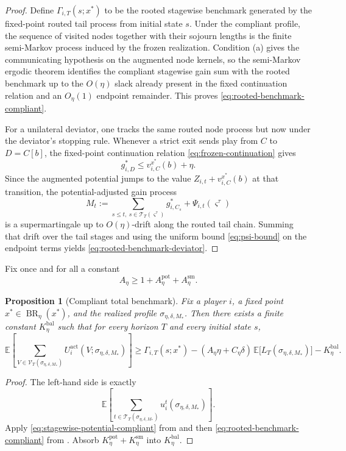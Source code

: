 \documentclass[12pt]{article}
\newtheorem{proposition}[theorem]{Proposition}
\theoremstyle{definition}
\newcommand{\E}{\mathbb{E}}
\newcommand{\1}{\mathbf{1}}
\DeclareMathOperator{\BR}{BR}
\begin{document}
\begin{proof}
Define $\Gamma_{i,T}(s;x^*)$ to be the rooted stagewise benchmark generated by the
fixed-point routed tail process from initial state $s$. Under the compliant
profile, the sequence of visited nodes together with their sojourn lengths is the
finite semi-Markov process induced by the frozen realization. Condition
\textnormal{(a)} gives the communicating hypothesis on the augmented node kernels,
so the semi-Markov ergodic theorem identifies the compliant stagewise gain sum
with the rooted benchmark up to the $O(\eta)$ slack already present in the fixed
continuation relation and an $O_\eta(1)$ endpoint remainder. This proves
\eqref{eq:rooted-benchmark-compliant}.

For a unilateral deviator, one tracks the same routed node process but now under
the deviator's stopping rule. Whenever a strict exit sends play from $C$ to
$D=C[b]$, the fixed-point continuation relation \eqref{eq:frozen-continuation}
gives
\[
g_{i,D}^*\le v_{i,C}^{x^*}(b)+\eta.
\]
Since the augmented potential jumps to the value
$Z_{i,t}+v_{i,C}^{x^*}(b)$ at that transition, the potential-adjusted gain process
\[
M_t
:=
\sum_{s\le t,\ s\in\mathcal T_T(\varsigma^\tau)} g_{i,C_s}^*
+
\Psi_{i,t}(\varsigma^\tau)
\]
is a supermartingale up to $O(\eta)$-drift along the routed tail chain. Summing
that drift over the tail stages and using the uniform bound
\eqref{eq:psi-bound} on the endpoint terms yields
\eqref{eq:rooted-benchmark-deviator}.
\end{proof}


Fix once and for all a constant
\[
A_\eta\ge 1+A_\eta^{\mathrm{pot}}+A_\eta^{\mathrm{sm}}.
\]

\begin{proposition}[Compliant total benchmark]
\label{prop:routing-balance}
Fix a player $i$, a fixed point $x^*\in\BR_\eta(x^*)$, and the realized profile
$\sigma_{\eta,\delta,M_*}$. Then there exists a finite constant
$K_\eta^{\mathrm{bal}}$ such that for every horizon $T$ and every initial state
$s$,
\begin{equation}
\label{eq:routing-balance}
\E\left[
\sum_{V\in\mathcal V_T(\sigma_{\eta,\delta,M_*})}
U_i^{\mathrm{act}}(V;\sigma_{\eta,\delta,M_*})
\right]
\ge
\Gamma_{i,T}(s;x^*)
-
(A_\eta\eta+C_\eta\delta)\,
\E\bigl[L_T(\sigma_{\eta,\delta,M_*})\bigr]
-
K_\eta^{\mathrm{bal}}.
\end{equation}
\end{proposition}

\begin{proof}
The left-hand side is exactly
\[
\E\left[
\sum_{t\in\mathcal T_T(\sigma_{\eta,\delta,M_*})}
u_i^t(\sigma_{\eta,\delta,M_*})
\right].
\]
Apply \eqref{eq:stagewise-potential-compliant} from
 and then \eqref{eq:rooted-benchmark-compliant} from
. Absorb
$K_\eta^{\mathrm{pot}}+K_\eta^{\mathrm{sm}}$ into $K_\eta^{\mathrm{bal}}$.
\end{proof}
\end{document}
